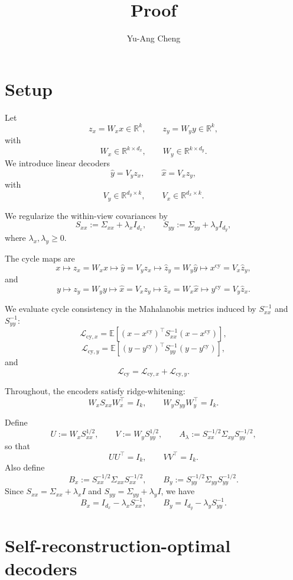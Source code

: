 \documentclass{article}
\title{Proof}
\author{Yu-Ang Cheng}
\begin{document}
\maketitle

\section{Setup}
Let
\[
z_x = W_x x \in \mathbb{R}^k,
\qquad
z_y = W_y y \in \mathbb{R}^k,
\]
with
\[
W_x \in \mathbb{R}^{k\times d_x},
\qquad
W_y \in \mathbb{R}^{k\times d_y}.
\]
We introduce linear decoders
\[
\hat y = V_y z_x,
\qquad
\hat x = V_x z_y,
\]
with
\[
V_y \in \mathbb{R}^{d_y\times k},
\qquad
V_x \in \mathbb{R}^{d_x\times k}.
\]

We regularize the within-view covariances by
\[
S_{xx} := \Sigma_{xx} + \lambda_x I_{d_x},
\qquad
S_{yy} := \Sigma_{yy} + \lambda_y I_{d_y},
\]
where \(\lambda_x,\lambda_y \ge 0\).

The cycle maps are
\[
x \mapsto z_x = W_x x
\mapsto \hat y = V_y z_x
\mapsto \hat z_y = W_y \hat y
\mapsto x^{\mathrm{cy}} = V_x \hat z_y,
\]
and
\[
y \mapsto z_y = W_y y
\mapsto \hat x = V_x z_y
\mapsto \hat z_x = W_x \hat x
\mapsto y^{\mathrm{cy}} = V_y \hat z_x.
\]

We evaluate cycle consistency in the Mahalanobis metrics induced by
\(S_{xx}^{-1}\) and \(S_{yy}^{-1}\):
\[
\mathcal L_{\mathrm{cy},x}
=
\mathbb E\!\left[
(x-x^{\mathrm{cy}})^\top S_{xx}^{-1}(x-x^{\mathrm{cy}})
\right],
\]
\[
\mathcal L_{\mathrm{cy},y}
=
\mathbb E\!\left[
(y-y^{\mathrm{cy}})^\top S_{yy}^{-1}(y-y^{\mathrm{cy}})
\right],
\]
and
\[
\mathcal L_{\mathrm{cy}}
=
\mathcal L_{\mathrm{cy},x}+\mathcal L_{\mathrm{cy},y}.
\]

Throughout, the encoders satisfy ridge-whitening:
\[
W_x S_{xx} W_x^\top = I_k,
\qquad
W_y S_{yy} W_y^\top = I_k.
\]

Define
\[
U := W_x S_{xx}^{1/2},
\qquad
V := W_y S_{yy}^{1/2},
\qquad
A_\lambda := S_{xx}^{-1/2}\Sigma_{xy}S_{yy}^{-1/2},
\]
so that
\[
UU^\top = I_k,
\qquad
VV^\top = I_k.
\]
Also define
\[
B_x := S_{xx}^{-1/2}\Sigma_{xx}S_{xx}^{-1/2},
\qquad
B_y := S_{yy}^{-1/2}\Sigma_{yy}S_{yy}^{-1/2}.
\]
Since \(S_{xx}=\Sigma_{xx}+\lambda_x I\) and \(S_{yy}=\Sigma_{yy}+\lambda_y I\),
we have
\[
B_x = I_{d_x} - \lambda_x S_{xx}^{-1},
\qquad
B_y = I_{d_y} - \lambda_y S_{yy}^{-1}.
\]


\section{Self-reconstruction-optimal decoders}
\end{document}
